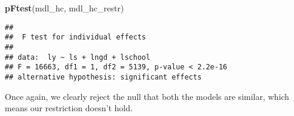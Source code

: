 \documentclass[]{article}
\newenvironment{Shaded}{\begin{snugshade}}{\end{snugshade}}
\newcommand{\KeywordTok}[1]{\textcolor[rgb]{0.13,0.29,0.53}{\textbf{#1}}}
\newcommand{\NormalTok}[1]{#1}
\begin{document}
\begin{Shaded}
\begin{Highlighting}[]
\KeywordTok{pFtest}\NormalTok{(mdl_hc, mdl_hc_restr)}
\end{Highlighting}
\end{Shaded}

\begin{verbatim}
## 
##  F test for individual effects
## 
## data:  ly ~ ls + lngd + lschool
## F = 16663, df1 = 1, df2 = 5139, p-value < 2.2e-16
## alternative hypothesis: significant effects
\end{verbatim}

Once again, we clearly reject the null that both the models are similar,
which means our restriction doesn't hold.
\end{document}
